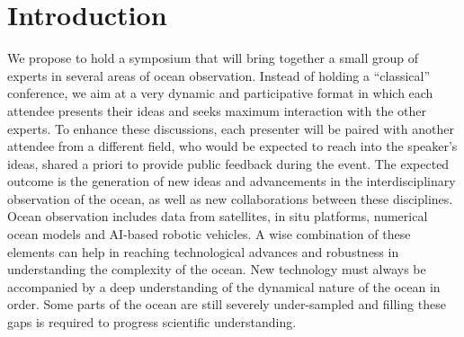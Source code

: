\section{Introduction}

We propose to hold a symposium that will bring together a small group of
experts in several areas of ocean observation. Instead of holding a
“classical” conference, we aim at a very dynamic and participative
format in which each attendee presents their ideas and seeks maximum
interaction with the other experts. To enhance these discussions, each
presenter will be paired with another attendee from a different field,
who would be expected to reach into the speaker’s ideas, shared a priori
to provide public feedback during the event. The expected outcome is the
generation of new ideas and advancements in the interdisciplinary
observation of the ocean, as well as new collaborations between these
disciplines. Ocean observation includes data from satellites, in situ
platforms, numerical ocean models and AI-based robotic vehicles. A wise
combination of these elements can help in reaching technological
advances and robustness in understanding the complexity of the
ocean. New technology must always be accompanied by a deep understanding
of the dynamical nature of the ocean in order. Some parts of the ocean
are still severely under-sampled and filling these gaps is required to
progress scientific understanding.
